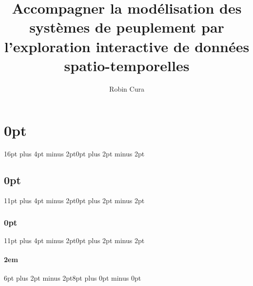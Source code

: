 \titlespacing\section{0pt}{16pt plus 4pt minus 2pt}{0pt plus 2pt minus 2pt}
\titlespacing\subsection{0pt}{11pt plus 4pt minus 2pt}{0pt plus 2pt minus 2pt}
\titlespacing\subsubsection{0pt}{11pt plus 4pt minus 2pt}{0pt plus 2pt minus 2pt}
\titlespacing\paragraph{2em}{6pt plus 2pt minus 2pt}{8pt plus 0pt minus 0pt}



\usepackage{pbox}
\usepackage{array}%



\usepackage{multicol}


\usepackage[bottom]{footmisc}
\newcommand{\astfootnote}[1]{
	\let\oldthefootnote=\thefootnote
	\setcounter{footnote}{0}
	\renewcommand{\thefootnote}{\fnsymbol{footnote}}
	\hspace*{-.45cm}\footnote{#1}\unskip
	\let\thefootnote=\oldthefootnote
}



\usepackage{afterpage}
\newcommand\blankpage{%
	\null
	\thispagestyle{empty}%
	\addtocounter{page}{-1}%
	\newpage}


\newfontfamily{}
\newfontfamily{}


\usepackage{titling}
\title{Accompagner la modélisation des systèmes de peuplement par l’exploration interactive de données spatio-temporelles}
\author{Robin Cura}
\date{\vspace{-5ex}}
\makeatletter
\newcommand*{\toccontents}{\@starttoc{toc}}
\makeatother